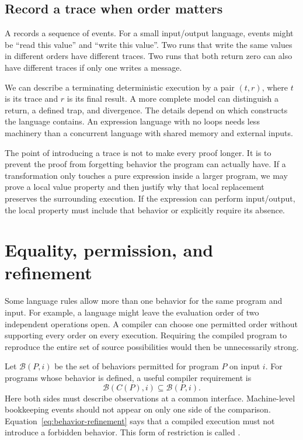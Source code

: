 \subsection{Record a trace when order matters}
\label{sec:behavior-traces}

A  records a sequence of events.
For a small input/output language, events might be \enquote{read this value} and \enquote{write this value}.
Two runs that write the same values in different orders have different traces.
Two runs that both return zero can also have different traces if only one writes a message.

We can describe a terminating deterministic execution by a pair $(t,r)$, where $t$ is its trace and $r$ is its final result.
A more complete model can distinguish a return, a defined trap, and divergence.
The details depend on which constructs the language contains.
An expression language with no loops needs less machinery than a concurrent language with shared memory and external inputs.

The point of introducing a trace is not to make every proof longer.
It is to prevent the proof from forgetting behavior the program can actually have.
If a transformation only touches a pure expression inside a larger program, we may prove a local value property and then justify why that local replacement preserves the surrounding execution.
If the expression can perform input/output, the local property must include that behavior or explicitly require its absence.

\section{Equality, permission, and refinement}
\label{sec:behavior-refinement}

Some language rules allow more than one behavior for the same program and input.
For example, a language might leave the evaluation order of two independent operations open.
A compiler can choose one permitted order without supporting every order on every execution.
Requiring the compiled program to reproduce the entire set of source possibilities would then be unnecessarily strong.

Let $\mathcal{B}(P,i)$ be the set of behaviors permitted for program $P$ on input $i$.
For programs whose behavior is defined, a useful compiler requirement is
\begin{equation}
  \mathcal{B}(C(P),i)\subseteq\mathcal{B}(P,i).
  \label{eq:behavior-refinement}
\end{equation}
Here both sides must describe observations at a common interface.
Machine-level bookkeeping events should not appear on only one side of the comparison.
Equation~\ref{eq:behavior-refinement} says that a compiled execution must not introduce a forbidden behavior.
This form of restriction is called .

